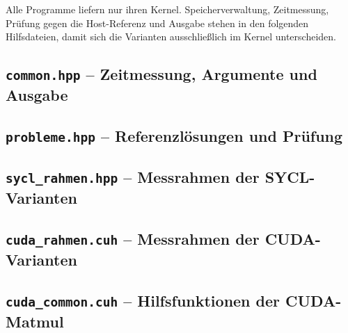 \documentclass[12pt,a4paper]{article}
\begin{document}
Alle Programme liefern nur ihren Kernel. Speicherverwaltung, Zeitmessung,
Prüfung gegen die Host-Referenz und Ausgabe stehen in den folgenden
Hilfsdateien, damit sich die Varianten ausschließlich im Kernel
unterscheiden.

\subsection{\texttt{common.hpp} -- Zeitmessung, Argumente und Ausgabe}\label{lst:common}


\subsection{\texttt{probleme.hpp} -- Referenzlösungen und Prüfung}


\subsection{\texttt{sycl\_rahmen.hpp} -- Messrahmen der SYCL-Varianten}


\subsection{\texttt{cuda\_rahmen.cuh} -- Messrahmen der CUDA-Varianten}


\subsection{\texttt{cuda\_common.cuh} -- Hilfsfunktionen der CUDA-Matmul}

\end{document}
